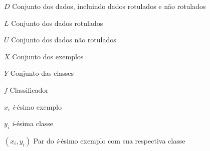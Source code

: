 \renewcommand{\listadesimbolosname}{\normalsize{\textbf{LISTA DE SÍMBOLOS}}}

\begin{simbolos}
    \item[$D$] Conjunto dos dados, incluindo dados rotulados e não rotulados
    \item[$L$] Conjunto dos dados rotulados
    \item[$U$] Conjunto dos dados não rotulados
    \item[$X$] Conjunto dos exemplos
    \item[$Y$] Conjunto das classes
    \item[$f$] Classificador
    \item[$x_i$] \textit{i}\hyp{ésimo} exemplo
    \item[$y_i$] \textit{i}\hyp{ésima} classe
    \item[$(x_i, y_i)$] Par do \textit{i}\hyp{ésimo} exemplo com sua respectiva classe
\end{simbolos}